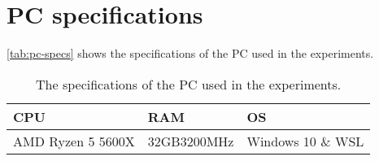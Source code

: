 \section{PC specifications}\label{sec:pc-specs}
\autoref{tab:pc-specs} shows the specifications of the PC used in the experiments.

\begin{table}[htb!]
    \centering
    \begin{tabular}{lll}
        \toprule
        CPU               & RAM         & OS                \\
        \midrule
        AMD Ryzen 5 5600X & 32GB3200MHz & Windows 10 \& WSL \\
    \end{tabular}
    \caption{The specifications of the PC used in the experiments.}
    \label{tab:pc-specs}
\end{table}